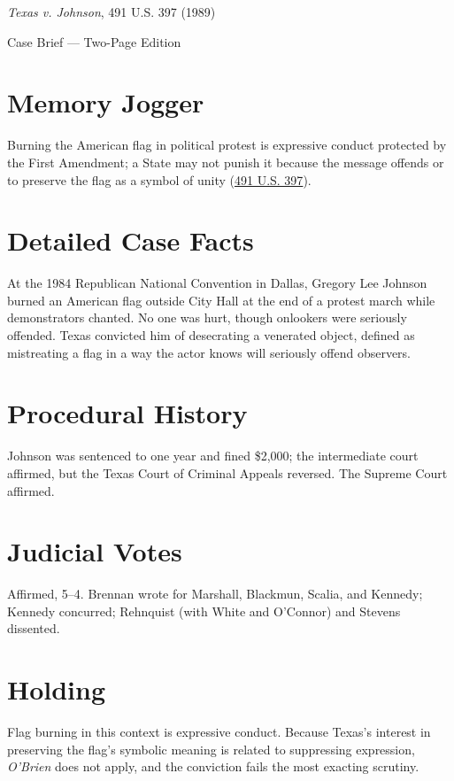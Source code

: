 \documentclass[12pt]{article}
\begin{document}
\begin{center}
{\LARGE \textit{Texas v. Johnson}, 491 U.S. 397 (1989)\par}
\vspace{0.5em}
{\large Case Brief --- Two-Page Edition\par}
\end{center}

\section{Memory Jogger}
Burning the American flag in political protest is expressive conduct protected by the First Amendment; a State may not punish it because the message offends or to preserve the flag as a symbol of unity (\href{https://www.courtlistener.com/opinion/112304/texas-v-johnson/}{491 U.S. 397}).

\section{Detailed Case Facts}
At the 1984 Republican National Convention in Dallas, Gregory Lee Johnson burned an American flag outside City Hall at the end of a protest march while demonstrators chanted. No one was hurt, though onlookers were seriously offended. Texas convicted him of desecrating a venerated object, defined as mistreating a flag in a way the actor knows will seriously offend observers.

\section{Procedural History}
Johnson was sentenced to one year and fined \$2,000; the intermediate court affirmed, but the Texas Court of Criminal Appeals reversed. The Supreme Court affirmed.

\section{Judicial Votes}
Affirmed, 5--4. Brennan wrote for Marshall, Blackmun, Scalia, and Kennedy; Kennedy concurred; Rehnquist (with White and O'Connor) and Stevens dissented.

\section{Holding}
Flag burning in this context is expressive conduct. Because Texas's interest in preserving the flag's symbolic meaning is related to suppressing expression, \textit{O'Brien} does not apply, and the conviction fails the most exacting scrutiny.
\end{document}

